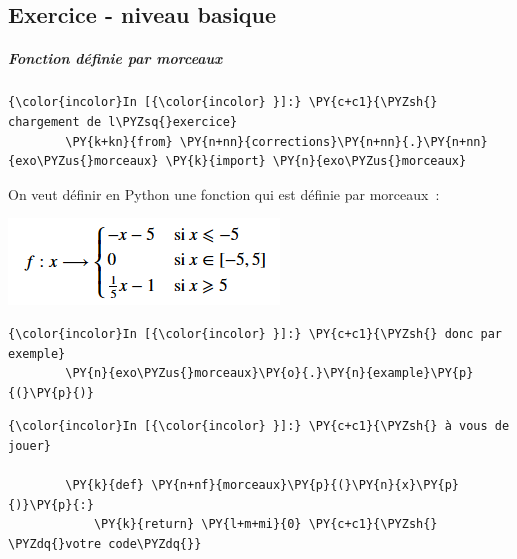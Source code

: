     \hypertarget{exercice---niveau-basique}{%
\subsection{Exercice - niveau basique}\label{exercice---niveau-basique}}

    \hypertarget{fonction-duxe9finie-par-morceaux}{%
\subparagraph{Fonction définie par
morceaux}\label{fonction-duxe9finie-par-morceaux}}

    \begin{Verbatim}[commandchars=\\\{\}]
{\color{incolor}In [{\color{incolor} }]:} \PY{c+c1}{\PYZsh{} chargement de l\PYZsq{}exercice}
        \PY{k+kn}{from} \PY{n+nn}{corrections}\PY{n+nn}{.}\PY{n+nn}{exo\PYZus{}morceaux} \PY{k}{import} \PY{n}{exo\PYZus{}morceaux}
\end{Verbatim}


    On veut définir en Python une fonction qui est définie par morceaux~:




\includegraphics{medias/equation.png}

    \begin{Verbatim}[commandchars=\\\{\}]
{\color{incolor}In [{\color{incolor} }]:} \PY{c+c1}{\PYZsh{} donc par exemple}
        \PY{n}{exo\PYZus{}morceaux}\PY{o}{.}\PY{n}{example}\PY{p}{(}\PY{p}{)}
\end{Verbatim}


    \begin{Verbatim}[commandchars=\\\{\}]
{\color{incolor}In [{\color{incolor} }]:} \PY{c+c1}{\PYZsh{} à vous de jouer}
        
        \PY{k}{def} \PY{n+nf}{morceaux}\PY{p}{(}\PY{n}{x}\PY{p}{)}\PY{p}{:}
            \PY{k}{return} \PY{l+m+mi}{0} \PY{c+c1}{\PYZsh{} \PYZdq{}votre code\PYZdq{}}
\end{Verbatim}


